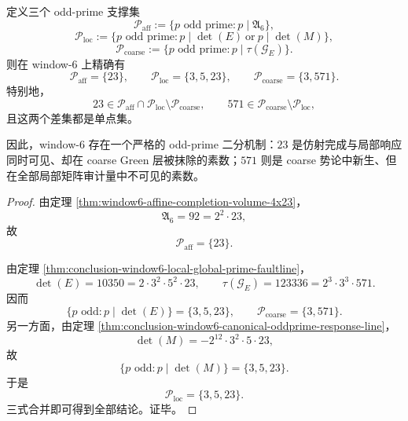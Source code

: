 \begin{theorem}\label{thm:conclusion-window6-oddprime-affine-local-coarse-translation}
定义三个 odd-prime 支撑集
\[
\mathcal P_{\mathrm{aff}}
:=
\{p\text{ odd prime}:p\mid \mathfrak A_6\},
\]
\[
\mathcal P_{\mathrm{loc}}
:=
\{p\text{ odd prime}:p\mid \det(E)\ \text{or}\ p\mid \det(M)\},
\]
\[
\mathcal P_{\mathrm{coarse}}
:=
\{p\text{ odd prime}:p\mid \tau(\mathcal G_E)\}.
\]
则在 window-\(6\) 上精确有
\[
\mathcal P_{\mathrm{aff}}=\{23\},
\qquad
\mathcal P_{\mathrm{loc}}=\{3,5,23\},
\qquad
\mathcal P_{\mathrm{coarse}}=\{3,571\}.
\]
特别地，
\[
23\in
\mathcal P_{\mathrm{aff}}\cap \mathcal P_{\mathrm{loc}}
\setminus
\mathcal P_{\mathrm{coarse}},
\qquad
571\in
\mathcal P_{\mathrm{coarse}}
\setminus
\mathcal P_{\mathrm{loc}},
\]
且这两个差集都是单点集。

因此，window-\(6\) 存在一个严格的 odd-prime 二分机制：\(23\) 是仿射完成与局部响应同时可见、却在 coarse Green 层被抹除的素数；\(571\) 则是 coarse 势论中新生、但在全部局部矩阵审计量中不可见的素数。
\end{theorem}
\begin{proof}
由定理 \ref{thm:window6-affine-completion-volume-4x23}，
\[
\mathfrak A_6=92=2^2\cdot 23,
\]
故
\[
\mathcal P_{\mathrm{aff}}=\{23\}.
\]

由定理 \ref{thm:conclusion-window6-local-global-prime-faultline}，
\[
\det(E)=10350=2\cdot 3^2\cdot 5^2\cdot 23,
\qquad
\tau(\mathcal G_E)=123336=2^3\cdot 3^3\cdot 571.
\]
因而
\[
\{p\text{ odd}:p\mid \det(E)\}=\{3,5,23\},
\qquad
\mathcal P_{\mathrm{coarse}}=\{3,571\}.
\]
另一方面，由定理 \ref{thm:conclusion-window6-canonical-oddprime-response-line}，
\[
\det(M)=-2^{12}\cdot 3^2\cdot 5\cdot 23,
\]
故
\[
\{p\text{ odd}:p\mid \det(M)\}=\{3,5,23\}.
\]
于是
\[
\mathcal P_{\mathrm{loc}}=\{3,5,23\}.
\]
三式合并即可得到全部结论。证毕。
\end{proof}

